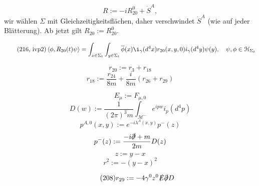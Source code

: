 \documentclass[oneside,reqno,12pt]{amsart}
\begin{document}
\begin{equation}
R:= -i R^0_{20} + \dot{S}^A,
\end{equation}
wir wählen \(\Sigma\) mit Gleichzeitigkeitsflächen, daher verschwindet \(\dot{S}^A\) (wie auf jeder Blätterung). Ab jetzt gilt 
\(R_{20}:=R^0_{20}\).


\begin{equation}\tag{216, ivp2}
 \left< \phi, R_{20}(t) \psi \right> = \int_{x\in \Sigma_t} \int_{y\in \Sigma_t} \overline{\phi}(x)\i_\gamma (d^4 x) r_{20} (x,y,0) i_\gamma(d^4 y) \psi(y), \quad \psi, \phi \in \mathcal{H}_{\Sigma_t}
\end{equation}

\begin{equation}\tag{215}
r_{20}:= r_3+r_{18}
\end{equation}
\begin{equation}\tag{214}
r_{18}:= \frac{r_{24}}{8m} + \frac{i}{8m}(r_{26} + r_{29})
\end{equation}

\begin{equation}
E_\mu:= F_{\mu,0}
\end{equation}
\begin{equation}
D(w):=\frac{1}{(2\pi)^3m} \int_{\mathcal{M}^-} e^{i p w } i_p (d^4p)
\end{equation}
\begin{equation}
p^{A,0}(x,y):= e^{-i\lambda^A(x,y)}p^- (z)
\end{equation}
\begin{equation}
p^-(z):=\frac{-i \slashed{\partial} +m}{2m} D(z)
\end{equation}
\begin{equation}
z:= y-x
\end{equation}
\begin{equation}
r^2:= - (y-x)^2
\end{equation}



\begin{equation}\tag{208}
r_{29}:= -4 \gamma^0 z^0 \slashed{E} \slashed{\partial}D
\end{equation}
\end{document}
